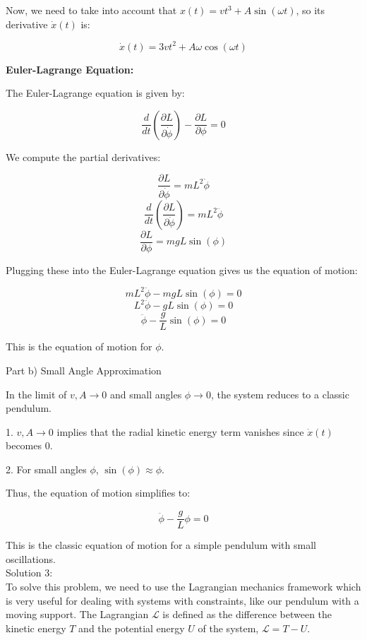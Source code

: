 \documentclass[a4paper,11pt]{article}
\begin{document}
Now, we need to take into account that \( x(t) = v t^3 + A \sin(\omega t) \), so its derivative \( \dot{x}(t) \) is:

\[ \dot{x}(t) = 3 v t^2 + A \omega \cos(\omega t) \]

\textbf{Euler-Lagrange Equation:}

The Euler-Lagrange equation is given by:

\[ \frac{d}{dt} \left(\frac{\partial L}{\partial \dot{\phi}}\right) - \frac{\partial L}{\partial \phi} = 0 \]

We compute the partial derivatives:

\[ \frac{\partial L}{\partial \dot{\phi}} = m L^2 \dot{\phi} \]
\[ \frac{d}{dt} \left(\frac{\partial L}{\partial \dot{\phi}}\right) = m L^2 \ddot{\phi} \]
\[ \frac{\partial L}{\partial \phi} = m g L \sin(\phi) \]

Plugging these into the Euler-Lagrange equation gives us the equation of motion:

\[ m L^2 \ddot{\phi} - m g L \sin(\phi) = 0 \]
\[ L^2 \ddot{\phi} - g L \sin(\phi) = 0 \]
\[ \ddot{\phi} - \frac{g}{L} \sin(\phi) = 0 \]

This is the equation of motion for \( \phi \).

Part b) Small Angle Approximation

In the limit of \( v, A \rightarrow 0 \) and small angles \( \phi \rightarrow 0 \), the system reduces to a classic pendulum.

1. \( v, A \rightarrow 0 \) implies that the radial kinetic energy term vanishes since \( \dot{x}(t) \) becomes 0.

2. For small angles \( \phi \), \( \sin(\phi) \approx \phi \).

Thus, the equation of motion simplifies to:

\[ \ddot{\phi} - \frac{g}{L} \phi = 0 \]

This is the classic equation of motion for a simple pendulum with small oscillations. \\

\noindent Solution 3: \\

To solve this problem, we need to use the Lagrangian mechanics framework which is very useful for dealing with systems with constraints, like our pendulum with a moving support. The Lagrangian \( \mathcal{L} \) is defined as the difference between the kinetic energy \( T \) and the potential energy \( U \) of the system, \( \mathcal{L} = T - U \).
\end{document}
